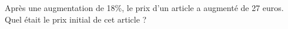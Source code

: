  
Après une augmentation de 18\%, le prix d'un article a augmenté de 27 euros. Quel était le prix initial de cet article ? 
 

